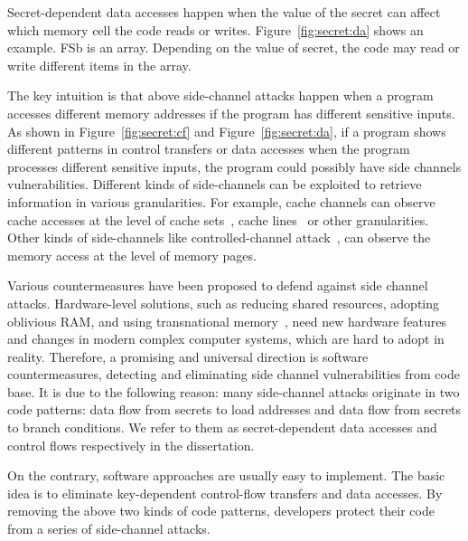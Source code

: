 Secret-dependent data accesses happen when the value of the secret can affect which memory cell the code reads or writes. Figure~\ref{fig:secret:da} shows an example. \textsf{FSb} is an array. Depending on the value of \textsf{secret}, the code may read or write different items in the array.

The key intuition is that above side-channel attacks happen when a
program accesses different memory addresses if the program has different
sensitive inputs. As shown in Figure~\ref{fig:secret:cf} and Figure~\ref{fig:secret:da},
if a program shows different patterns in
control transfers or data accesses when the program processes different
sensitive inputs, the program could possibly have side channels vulnerabilities.
Different kinds of side-channels can be exploited to retrieve information in
various granularities. For example, cache channels can observe cache
accesses at the level of cache sets~\cite{liu2015last}, cache lines~\cite{184415} or other granularities.
Other kinds of side-channels like controlled-channel attack~\cite{7163052},
can observe the memory access at the level of memory pages.


Various countermeasures have been proposed to defend against
side channel attacks. Hardware-level solutions, such as reducing shared
resources, adopting oblivious RAM, and using transnational
memory~\cite{203878,217537,shih2017t,Zhang:2015:HDL:2775054.2694372}, need new
hardware features and changes in modern complex computer systems, which are
hard to adopt in reality. Therefore, a promising and universal direction is software countermeasures, detecting and eliminating side channel vulnerabilities from code base. It is due to the following reason: many side-channel attacks originate in two code patterns: data flow from secrets to load addresses and data flow from secrets to branch conditions. We refer to them as secret-dependent data accesses and control flows respectively in the dissertation.

On the contrary, software approaches are
usually easy to implement. The basic idea is to eliminate key-dependent
control-flow transfers and data accesses. By removing the above two kinds of code patterns, developers protect their
code from a series of side-channel attacks.

